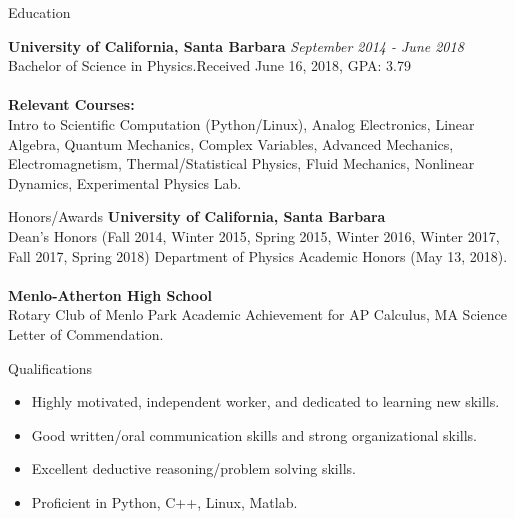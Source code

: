 \documentclass{resume} %
\begin{document}

\begin{rSection}{Education}

{\bf University of California, Santa Barbara} \hfill {\em September 2014 - June 2018} 
\\ Bachelor of Science in Physics.\hfill {Received June 16, 2018, GPA: 3.79 } \\ \\
{\bf Relevant Courses:}
\\ Intro to Scientific Computation (Python/Linux), Analog Electronics, Linear Algebra, Quantum Mechanics, Complex Variables, Advanced Mechanics, Electromagnetism, Thermal/Statistical Physics, Fluid Mechanics, Nonlinear Dynamics, Experimental Physics Lab.

\end{rSection}


\begin{rSection}{Honors/Awards}
{\bf University of California, Santa Barbara}
\\Dean’s Honors (Fall 2014, Winter 2015, Spring 2015, Winter 2016, Winter 2017, Fall 2017, Spring 2018) Department of Physics Academic Honors (May 13, 2018).\\
\\{\bf Menlo-Atherton High School}\\
Rotary Club of Menlo Park Academic Achievement for AP Calculus, MA Science Letter of Commendation.\\

\end{rSection}


\begin{rSection}{Qualifications}

\begin{itemize}
    \item Highly motivated, independent worker, and dedicated to learning new skills.
    \item Good written/oral communication skills and strong organizational skills.
    \item Excellent deductive reasoning/problem solving skills.
    \item Proficient in Python, C++, Linux, Matlab.
\end{itemize}

\end{rSection}
\end{document}
